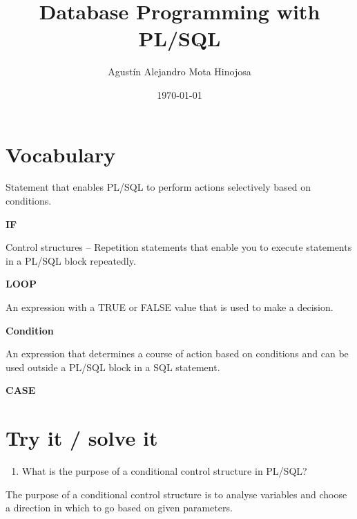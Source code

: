 \documentclass[11pt]{article}
\author{Agustín Alejandro Mota Hinojosa}
\date{\today}
\title{Database Programming with PL/SQL}
\begin{document}
\maketitle
\tableofcontents

\section{Vocabulary}
\label{sec:org2a690f4}

Statement that enables PL/SQL to perform actions selectively based on conditions.

\textbf{IF}

Control structures – Repetition statements that enable you to execute statements in a PL/SQL block repeatedly.

\textbf{LOOP}

An expression with a TRUE or FALSE value that is used to make a decision.

\textbf{Condition}

An expression that determines a course of action based on conditions and can be used outside a PL/SQL block in a SQL statement.

\textbf{CASE}
\section{Try it / solve it}
\label{sec:org0c9e4e8}

\begin{enumerate}
\item What is the purpose of a conditional control structure in PL/SQL?
\end{enumerate}


The purpose of a conditional control structure is to analyse variables and choose a direction in which to go based on given parameters.
\end{document}
